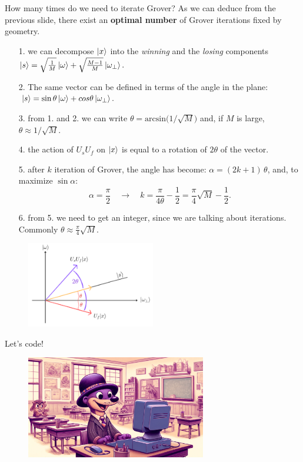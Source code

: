 \documentclass[aspectratio=169, 8pt, xcolor={svgnames}, hyperref={linkcolor=black}]{beamer}
\begin{document}
\begin{frame}{How many times do we need to iterate Grover?}
As we can deduce from the previous slide, there exist an \textbf{optimal number} of Grover iterations fixed by geometry.

\begin{itemize}
\item[1.] we can decompose $\ket{x}$ into the \textit{winning} and the \textit{losing}
components $\ket{s} = \sqrt{\frac{1}{M}} \ket{\omega} + \sqrt{\frac{M-1}{M}} \ket{\omega_{\bot}}.$
\item[2.]  The same vector can be
defined in terms of the angle in the plane: $\,\ket{s} = \sin \theta \ket{\omega} + cos \theta \ket{\omega_{\bot}}.$
\end{itemize}
\begin{multicols}{2}
\begin{itemize}
\item[3.] from 1. and 2. we can write $\theta = \text{arcsin}\bigl(1/\sqrt{M}\bigr)$ and, if $M$ is large,
$\theta \approx 1/\sqrt{M}. $
\item[4.] the action of $U_s U_f$ on $\ket{x}$ is equal to a rotation of $2\theta$ of the vector.
\item[5.] after $k$ iteration of Grover, the angle has become: $\alpha = (2k + 1)\,\theta$, and, to maximize $\sin \alpha$:
$$ \alpha = \frac{\pi}{2} \quad \to \quad k = \frac{\pi}{4\theta} - \frac{1}{2} = \frac{\pi}{4} \sqrt{M} - \frac{1}{2}. $$
\item[6.] from 5. we need to get an integer, since we are talking about iterations.
Commonly $\theta \approx \frac{\pi}{4} \sqrt{M}.$
\end{itemize}
\begin{figure}
   \includegraphics[width=0.5\textwidth]{figures/thetas.png}
\end{figure}
\end{multicols}
\end{frame}

\begin{frame}
\centering
\Huge Let's code!
\begin{figure}
   \includegraphics[width=0.7\textwidth]{figures/hands_on.png}
\end{figure}
\end{frame}
\end{document}

